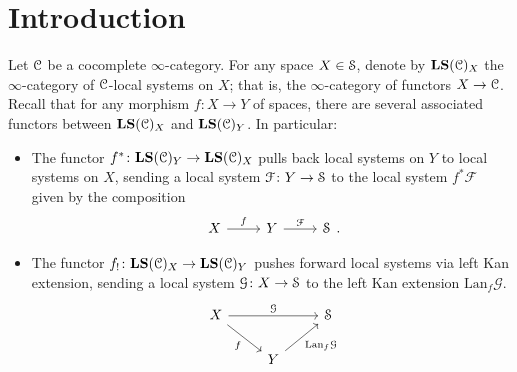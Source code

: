 \documentclass[main.tex]{subfiles}
\begin{document}
\section{Introduction}
\label{sec:introduction}

Let $\category{C}$ be a cocomplete $\infty$-category. For any space $X \in \S$, denote by $\LS(\category{C})_{X}$ the $\infty$-category of $\category{C}$-local systems on $X$; that is, the $\infty$-category of functors $X \to \category{C}$. Recall that for any morphism $f\colon X \to Y$ of spaces, there are several associated functors between $\LS(\category{C})_{X}$ and $\LS(\category{C})_{Y}$. In particular:
\begin{itemize}
  \item The functor $f^{*}\colon \LS(\category{C})_{Y} \to \LS(\category{C})_{X}$ pulls back local systems on $Y$ to local systems on $X$, sending a local system $\mathcal{F}\colon Y \to \S$ to the local system $f^{*}\mathcal{F}$ given by the composition
    \begin{equation*}
      \begin{tikzcd}
        X
        \arrow[r, "f"]
        & Y
        \arrow[r, "\mathcal{F}"]
        & \S
      \end{tikzcd}.
    \end{equation*}

  \item The functor $f_{!}\colon \LS(\category{C})_{X} \to \LS(\category{C})_{Y}$ pushes forward local systems via left Kan extension, sending a local system $\mathcal{G}\colon X \to \S$ to the left Kan extension $\mathrm{Lan}_{f}\mathcal{G}$.
    \begin{equation*}
      \begin{tikzcd}
        X
        \arrow[rr, "\mathcal{G}"]
        \arrow[dr, swap, "f"]
        && \S
        \\
        & Y
        \arrow[ur, swap, "\mathrm{Lan}_{f}\mathcal{G}"]
      \end{tikzcd}
    \end{equation*}
\end{itemize}
\end{document}
